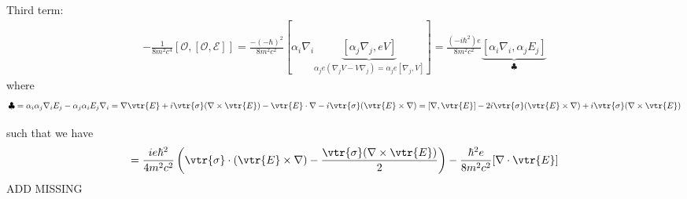 Third term:
\begin{align}[]
-\frac{1}{8m^2c^4}[\mathcal{O},[\mathcal{O},\mathcal{E}]]=\frac{-(-\hbar)^2}{8m^2c^2}\left[\alpha_i\nabla_i
\underbrace{\left[\alpha_j\nabla_j,eV\right]}_{\alpha_je(\nabla_j V-V\nabla_j)=\alpha_je[\nabla_j,V]}\right]
=\frac{(-i\hbar^2)e}{8m^2c^2}\underbrace{\left[\alpha_i\nabla_i,\alpha_jE_j\right]}_{\clubsuit}
\end{align}
where
\begin{align}[]
\clubsuit =\alpha_i\alpha_j\nabla_iE_j-\alpha_j\alpha_iE_j\nabla_i
=\nabla\vtr{E}+i\vtr{\sigma}(\nabla\times\vtr{E})-\vtr{E}\cdot\nabla-i\vtr{\sigma}(\vtr{E}\times\nabla)
=[\nabla,\vtr{E}]-2i\vtr{\sigma}(\vtr{E}\times\nabla)+i\vtr{\sigma}(\nabla\times\vtr{E})
\end{align}

such that we have
\begin{align}[]
=\frac{ie\hbar^2}{4m^2c^2}\left(\vtr{\sigma}\cdot(\vtr{E}\times\nabla)-\frac{\vtr{\sigma}(\nabla\times\vtr{E})}{2}\right)-\frac{\hbar^2e}{8m^2c^2}[\nabla\cdot\vtr{E}]
\end{align}
ADD MISSING
